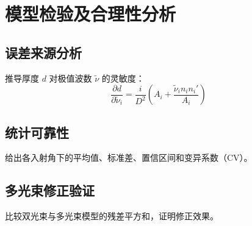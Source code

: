
\section{模型检验及合理性分析}

\subsection{误差来源分析}
推导厚度 $d$ 对极值波数 $\tilde{\nu}$ 的灵敏度：
\begin{equation}
    \frac{\partial d}{\partial \tilde{\nu}_i} = \frac{i}{D^2}\left(A_i + \frac{\tilde{\nu}_i n_i n_i'}{A_i}\right)
\end{equation}

\subsection{统计可靠性}
给出各入射角下的平均值、标准差、置信区间和变异系数（CV）。

\subsection{多光束修正验证}
比较双光束与多光束模型的残差平方和，证明修正效果。